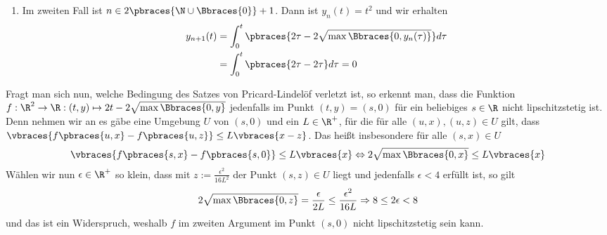 \begin{solution}
\begin{enumerate}[label = \alph*)]
\begin{enumerate}[label = \roman*)]
            \item Im zweiten Fall ist $n \in 2 \pbraces{\N \cup \Bbraces{0}} + 1$. Dann ist $y_n(t) = t^2$ und wir erhalten
            \begin{align*}
                y_{n+1}(t) &= \int_0^t \pbraces{2\tau - 2 \sqrt{\max\Bbraces{0, y_n(\tau)}}} d\tau \\
                &= \int_0^t \pbraces{2\tau - 2\tau} d\tau = 0
            \end{align*}
        \end{enumerate}
        Fragt man sich nun, welche Bedingung des Satzes von Pricard-Lindelöf verletzt ist, so erkennt man, dass die Funktion $f: \R^2 \to \R: (t,y) \mapsto 2t - 2\sqrt{\max\Bbraces{0,y}}$ jedenfalls im Punkt $(t,y) = (s,0)$ für ein beliebiges $s \in \R$ nicht lipschitzstetig ist. Denn nehmen wir an es gäbe eine Umgebung $U$ von $(s,0)$ und ein $L \in \R^+$, für die für alle $(u,x), (u,z) \in U$ gilt, dass $\vbraces{f\pbraces{u,x}- f\pbraces{u,z}} \leq L\vbraces{x - z}$. Das heißt insbesondere für alle $(s,x) \in U$
        \begin{align*}
            \vbraces{f\pbraces{s,x}- f\pbraces{s,0}} \leq L\vbraces{x} \Leftrightarrow 2\sqrt{\max\Bbraces{0, x}} \leq L\vbraces{x}
        \end{align*}
        Wählen wir nun $\epsilon \in \R^+$ so klein, dass mit $z := \frac{\epsilon^2}{16L^2}$ der Punkt $(s, z) \in U$ liegt und jedenfalls $\epsilon < 4$ erfüllt ist, so gilt 
        \begin{align*}
            2\sqrt{\max\Bbraces{0, z}} = \frac{\epsilon}{2L} \leq \frac{\epsilon^2}{16 L} \Rightarrow 8 \leq 2\epsilon < 8
        \end{align*}
        und das ist ein Widerspruch, weshalb $f$ im zweiten Argument im Punkt $(s,0)$ nicht lipschitzstetig sein kann.
    \end{enumerate}
    
\end{solution}